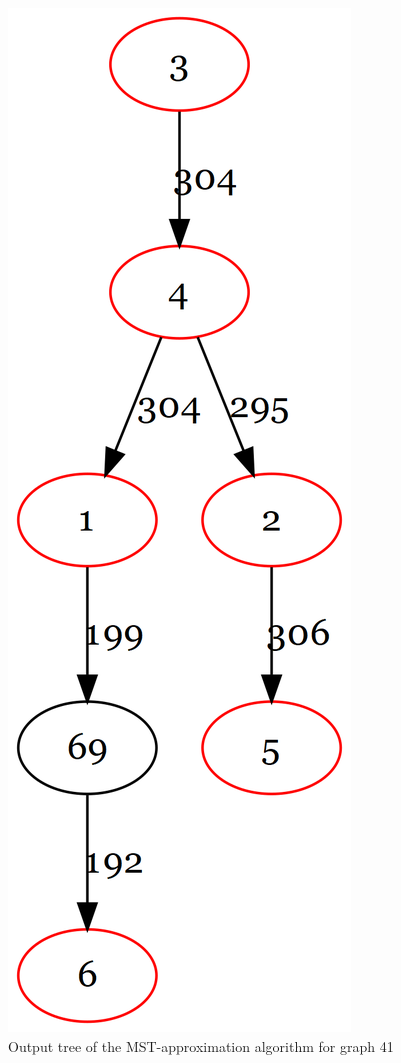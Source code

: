 \begin{figure}[htbp]
\centering
\includegraphics[scale=0.15]{figures/MST.png}
\caption{Output tree of the MST-approximation algorithm for graph 41}\label{fig:MSTTree41}
\end{figure}

